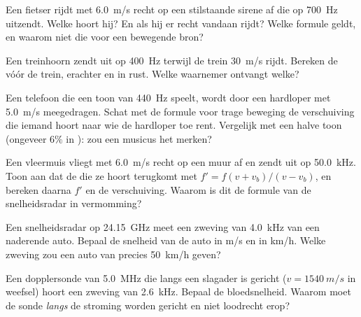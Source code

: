 \begin{exercise}[$\star$]\label{exo:g12:doppler-effect:3}
Een fietser rijdt met \qty{6.0}{m/s} recht op een stilstaande sirene af
die op \qty{700}{Hz} uitzendt. Welke  hoort hij? En als hij er
recht vandaan rijdt? Welke formule geldt, en waarom niet die voor een
bewegende bron?
\end{exercise}

\begin{exercise}[$\star$]\label{exo:g12:doppler-effect:4}
Een treinhoorn zendt uit op \qty{400}{Hz} terwijl de trein \qty{30}{m/s}
rijdt. Bereken de  vóór de trein, erachter en in rust. Welke
waarnemer ontvangt welke?
\end{exercise}

\begin{exercise}[$\star$]\label{exo:g12:doppler-effect:5}
Een telefoon die een toon van \qty{440}{Hz} speelt, wordt door een
hardloper met \qty{5.0}{m/s} meegedragen. Schat met de formule voor trage
beweging de verschuiving die iemand hoort naar wie de hardloper toe rent.
Vergelijk met een halve toon (ongeveer $6\%$ in ): zou een
musicus het merken?
\end{exercise}

\begin{exercise}[$\star\star$]\label{exo:g12:doppler-effect:6}
Een vleermuis vliegt met \qty{6.0}{m/s} recht op een muur af en zendt uit
op \qty{50.0}{kHz}. Toon aan dat de  die ze hoort terugkomt met
$f' = f(v + v_b)/(v - v_b)$, en bereken daarna $f'$ en de verschuiving.
Waarom is dit de formule van de snelheidsradar in vermomming?
\end{exercise}

\begin{exercise}[$\star\star$]\label{exo:g12:doppler-effect:7}
Een snelheidsradar op \qty{24.15}{GHz} meet een zweving van \qty{4.0}{kHz}
van een naderende auto. Bepaal de snelheid van de auto in \unit{m/s} en in
\unit{km/h}. Welke zweving zou een auto van precies \qty{50}{km/h} geven?
\end{exercise}

\begin{exercise}[$\star\star$]\label{exo:g12:doppler-effect:8}
Een dopplersonde van \qty{5.0}{MHz} die langs een slagader is gericht
($v = \qty{1540}{m/s}$ in weefsel) hoort een zweving van \qty{2.6}{kHz}.
Bepaal de bloedsnelheid. Waarom moet de sonde \emph{langs} de stroming
worden gericht en niet loodrecht erop?
\end{exercise}

